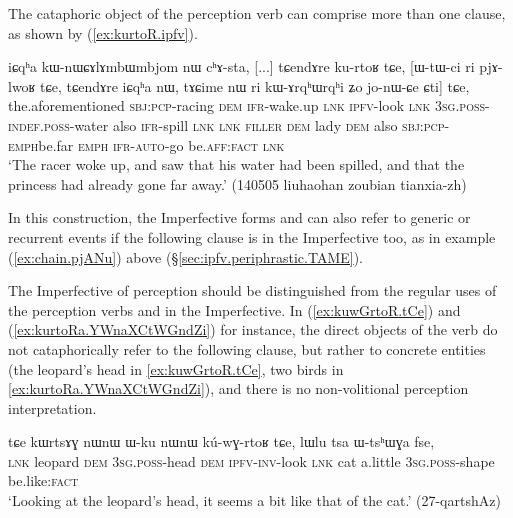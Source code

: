 The cataphoric object of the perception verb can comprise more than one clause, as shown by (\ref{ex:kurtoR.ipfv}).

\begin{exe}
\ex \label{ex:kurtoR.ipfv}
\gll  iɕqʰa kɯ-nɯɕɤlɤmbɯmbjom nɯ cʰɤ-sta, [...] tɕendɤre ku-rtoʁ tɕe, [ɯ-tɯ-ci ri pjɤ-lwoʁ tɕe, tɕendɤre iɕqʰa nɯ, tɤɕime nɯ ri kɯ-ɤrqʰɯ\redp{}rqʰi ʑo jo-nɯ-ɕe ɕti] tɕe, \\
the.aforementioned \textsc{sbj}:\textsc{pcp}-racing \textsc{dem} \textsc{ifr}-wake.up { } \textsc{lnk} \textsc{ipfv}-look \textsc{lnk} \textsc{3sg}.\textsc{poss}-\textsc{indef}.\textsc{poss}-water also \textsc{ifr}-spill  \textsc{lnk} \textsc{lnk} \textsc{filler} \textsc{dem} lady \textsc{dem} also \textsc{sbj}:\textsc{pcp}-\textsc{emph\redp}{}be.far \textsc{emph} \textsc{ifr}-\textsc{auto}-go be.\textsc{aff}:\textsc{fact} \textsc{lnk} \\
\glt `The racer woke up, and saw that his water had been spilled, and that the princess had already gone far away.' (140505 liuhaohan zoubian tianxia-zh)
\end{exe}

In this construction, the Imperfective forms  and  can also refer to generic or recurrent events if the following clause is in the Imperfective too, as in example (\ref{ex:chain.pjANu}) above (§\ref{sec:ipfv.periphrastic.TAME}).

The Imperfective of perception should be distinguished from the regular uses of the perception verbs  and  in the Imperfective. In (\ref{ex:kuwGrtoR.tCe}) and (\ref{ex:kurtoRa.YWnaXCtWGndZi}) for instance, the direct objects of the verb  do not cataphorically refer to the following clause, but rather to concrete entities (the leopard's head in \ref{ex:kuwGrtoR.tCe}, two birds in \ref{ex:kurtoRa.YWnaXCtWGndZi}), and there is no non-volitional perception interpretation.


\begin{exe}
\ex \label{ex:kuwGrtoR.tCe}
\gll  tɕe kɯrtsɤɣ nɯnɯ ɯ-ku nɯnɯ kú-wɣ-rtoʁ tɕe, lɯlu tsa ɯ-tsʰɯɣa fse, \\
\textsc{lnk} leopard \textsc{dem} \textsc{3sg}.\textsc{poss}-head \textsc{dem} \textsc{ipfv}-\textsc{inv}-look \textsc{lnk} cat a.little \textsc{3sg}.\textsc{poss}-shape be.like:\textsc{fact} \\
\glt `Looking at the leopard's head, it seems a bit like that of the cat.' (27-qartshAz)
\end{exe}

